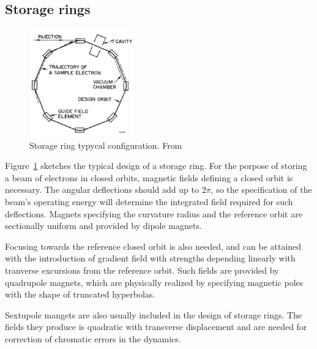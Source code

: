 \subsection{Storage rings}
\begin{figure}[htb]
    \centering
    \includegraphics[width=0.4\textwidth]{Images/storage_ring.png}
    \caption{Storage ring typycal configuration. From \cite{sands}}
    \label{sr}
\end{figure}
Figure~\ref{sr} sketches the typical design of a storage ring. For the porpose of storing a beam of electrons in closed orbits, magnetic fields defining a closed orbit is necessary. The angular deflections should add up to $2\pi$, so the specification of the beam's operating energy will determine the integrated field required for such deflections. Magnets specifying the curvature radius and the reference orbit are sectionally uniform and provided by dipole magnets.

Focusing towards the reference closed orbit is also needed, and can be attained with the introduction of gradient field with strengths depending linearly with tranverse excursions from the reference orbit. Such fields are provided by quadrupole magnets, which are physically realized by specifying  magnetic poles with the shape of truncated hyperbolas.

Sextupole mangets are also usually included in the design of storage rings. The fields they produce is quadratic with transverse displacement and are needed for correction of chromatic errors in the dynamics.

